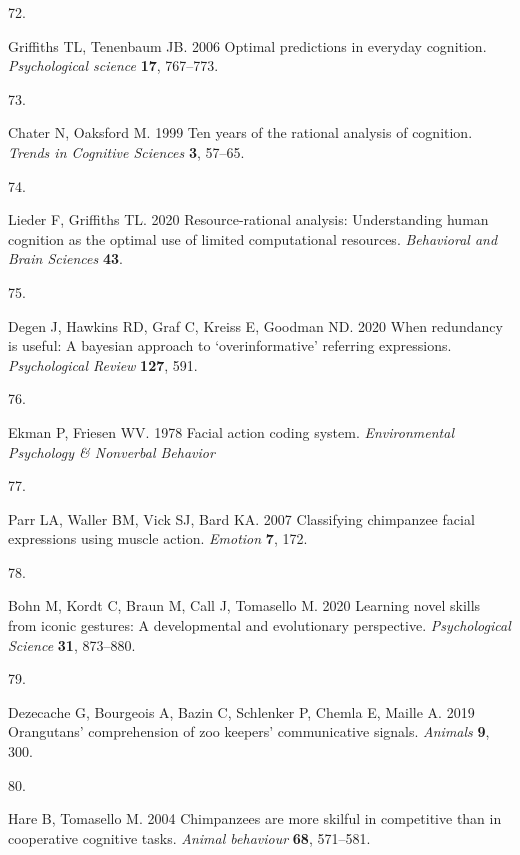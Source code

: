 \documentclass[
  man,floatsintext]{apa6}
\newlength{\cslhangindent}
\newlength{\csllabelwidth}
\newlength{\cslentryspacingunit} %
\newenvironment{CSLReferences}[2] %
 {%
  \setlength{\parindent}{0pt}
  \ifodd #1
  \let\oldpar\par
  \def\par{\hangindent=\cslhangindent\oldpar}
  \fi
  \setlength{\parskip}{#2\cslentryspacingunit}
 }%
 {}
\newcommand{\CSLLeftMargin}[1]{\parbox[t]{\csllabelwidth}{#1}}
\newcommand{\CSLRightInline}[1]{\parbox[t]{\linewidth - \csllabelwidth}{#1}\break}
\begin{document}
\begin{CSLReferences}{0}{0}
\leavevmode{}%
\CSLLeftMargin{72. }
\CSLRightInline{Griffiths TL, Tenenbaum JB. 2006 Optimal predictions in everyday cognition. \emph{Psychological science} \textbf{17}, 767--773.}

\leavevmode{}%
\CSLLeftMargin{73. }
\CSLRightInline{Chater N, Oaksford M. 1999 Ten years of the rational analysis of cognition. \emph{Trends in Cognitive Sciences} \textbf{3}, 57--65.}

\leavevmode{}%
\CSLLeftMargin{74. }
\CSLRightInline{Lieder F, Griffiths TL. 2020 Resource-rational analysis: Understanding human cognition as the optimal use of limited computational resources. \emph{Behavioral and Brain Sciences} \textbf{43}.}

\leavevmode{}%
\CSLLeftMargin{75. }
\CSLRightInline{Degen J, Hawkins RD, Graf C, Kreiss E, Goodman ND. 2020 When redundancy is useful: A bayesian approach to {`overinformative'} referring expressions. \emph{Psychological Review} \textbf{127}, 591.}

\leavevmode{}%
\CSLLeftMargin{76. }
\CSLRightInline{Ekman P, Friesen WV. 1978 Facial action coding system. \emph{Environmental Psychology \& Nonverbal Behavior} }

\leavevmode{}%
\CSLLeftMargin{77. }
\CSLRightInline{Parr LA, Waller BM, Vick SJ, Bard KA. 2007 Classifying chimpanzee facial expressions using muscle action. \emph{Emotion} \textbf{7}, 172.}

\leavevmode{}%
\CSLLeftMargin{78. }
\CSLRightInline{Bohn M, Kordt C, Braun M, Call J, Tomasello M. 2020 Learning novel skills from iconic gestures: A developmental and evolutionary perspective. \emph{Psychological Science} \textbf{31}, 873--880.}

\leavevmode{}%
\CSLLeftMargin{79. }
\CSLRightInline{Dezecache G, Bourgeois A, Bazin C, Schlenker P, Chemla E, Maille A. 2019 Orangutans' comprehension of zoo keepers' communicative signals. \emph{Animals} \textbf{9}, 300.}

\leavevmode{}%
\CSLLeftMargin{80. }
\CSLRightInline{Hare B, Tomasello M. 2004 Chimpanzees are more skilful in competitive than in cooperative cognitive tasks. \emph{Animal behaviour} \textbf{68}, 571--581.}


\end{CSLReferences}
\end{document}
